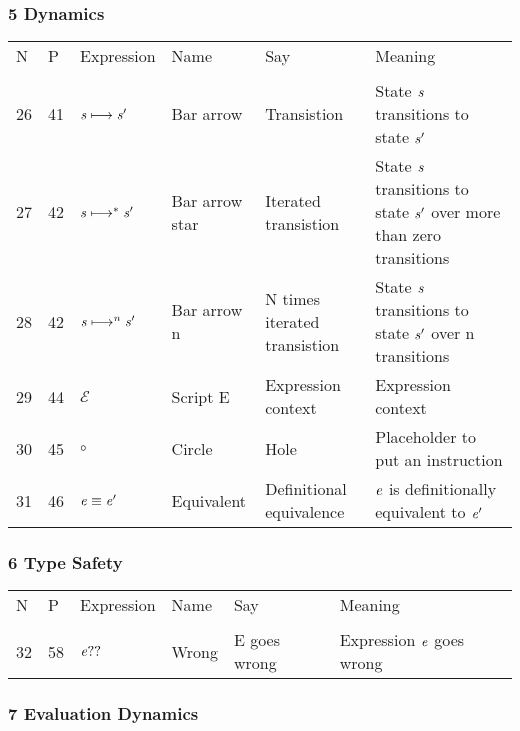 \documentclass[12pt]{article}
\begin{document}
\subsubsection*{5 Dynamics}
\begin{tabular}[b] {p{} p{} p{} p{} 
p{} p{}}
N & P & Expression & Name & Say & Meaning \\ \\
26& 41 & $\it{s} \longmapsto \it{s'}$ & Bar arrow & Transistion  & State $\it{s}$ transitions to state $\it{s'}$ \\

27& 42 & $\it{s} \longmapsto ^{*} \it{s'}$ & Bar arrow star & Iterated transistion  & State $\it{s}$ transitions to state $\it{s'}$ over more than zero transitions \\

28& 42 & $\it{s} \longmapsto ^{n} \it{s'}$ & Bar arrow n & N times iterated transistion  & State $\it{s}$ transitions to state $\it{s'}$ over n transitions \\

29& 44 & $\mathcal{E}$  & Script E & Expression context & Expression context \\

30& 45 & $\circ $ & Circle & Hole & Placeholder to put an instruction \\
31& 46 & $ \it{e} \equiv \it{e}' $ & Equivalent & Definitional equivalence & $\it{e}$ is definitionally equivalent to $\it{e}'$ \\

\end{tabular}

\subsubsection*{6 Type Safety}
\begin{tabular}[b] {p{} p{} p{} p{} 
p{} p{}}
N & P & Expression & Name & Say & Meaning \\ \\
32& 58 & $\it{e}??$ & Wrong & E goes wrong & Expression $\it{e}$ goes wrong \\

\end{tabular}
\subsubsection*{7 Evaluation Dynamics}
\end{document}
